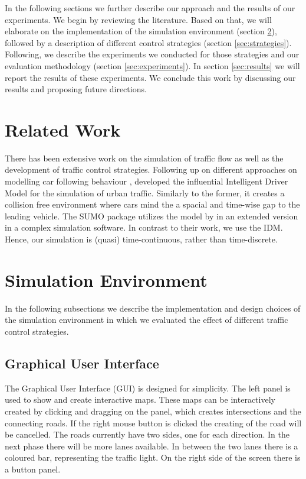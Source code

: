 \documentclass[10pt]{article}
\begin{document}
\vspace{20pt}

In the following sections we further describe our approach and the results of our experiments. We begin by reviewing the literature. Based on that, we will elaborate on the implementation of the simulation environment (section \ref{sec:envi}), followed by a description of different control strategies (section \ref{sec:strategies}). Following, we describe the experiments we conducted for those strategies and our evaluation methodology (section \ref{sec:experiments}). In section \ref{sec:results} we will report the results of these experiments.  We conclude this work by discussing our results and proposing future directions.

\section{Related Work}
\label{sec:related-work}
There has been extensive work on the simulation of traffic flow as well as the development of traffic control strategies. Following up on different approaches on modelling car following behaviour \citep[e.g.][]{gipps1981behavioural}, \citet{treiber2000congested} developed the influential Intelligent Driver Model for the simulation of urban traffic. Similarly to the former, it creates a collision free environment where cars mind the a spacial and time-wise gap to the leading vehicle. The SUMO package \citep{krajzewicz2002sumo, behrisch2011sumo} utilizes the model by \citep{gipps1981behavioural} in an extended version \citep{krauss1998microscopic} in a complex simulation software. In contrast to their work, we use the IDM. Hence, our simulation is (quasi) time-continuous, rather than time-discrete.
	
\section{Simulation Environment}
\label{sec:envi}
In the following subsections we describe the implementation and design choices of the simulation environment in which we evaluated the effect of different traffic control strategies.

\subsection{Graphical User Interface}
The Graphical User Interface (GUI) is designed for simplicity. The left panel is used to show and create interactive maps. These maps can be interactively created by clicking and dragging on the panel, which creates intersections and the connecting roads. If the right mouse button is clicked the creating of the road will be cancelled. The roads currently have two sides, one for each direction. In the next phase there will be more lanes available. In between the two lanes there is a coloured bar, representing the traffic light. On the right side of the screen there is a button panel.
\end{document}

